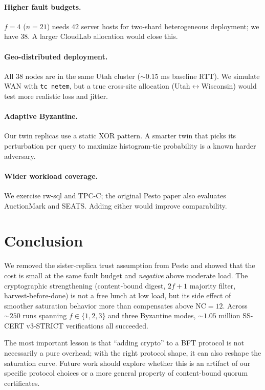 \documentclass[letterpaper,twocolumn,10pt]{article}
\begin{document}
\paragraph{Higher fault budgets.} $f=4$ ($n=21$) needs $42$ server
hosts for two-shard heterogeneous deployment; we have $38$. A larger
CloudLab allocation would close this.

\paragraph{Geo-distributed deployment.} All $38$ nodes are in the same
Utah cluster ($\sim 0.15$ ms baseline RTT). We simulate WAN with
\texttt{tc netem}, but a true cross-site allocation
(Utah$\leftrightarrow$Wisconsin) would test more realistic loss and
jitter.

\paragraph{Adaptive Byzantine.} Our twin replicas use a static XOR
pattern. A smarter twin that picks its perturbation per query to
maximize histogram-tie probability is a known harder adversary.

\paragraph{Wider workload coverage.} We exercise rw-sql and TPC-C; the
original Pesto paper also evaluates AuctionMark and SEATS. Adding
either would improve comparability.


\section{Conclusion}

We removed the sister-replica trust assumption from Pesto and showed
that the cost is small at the same fault budget and \emph{negative}
above moderate load. The cryptographic strengthening
(content-bound digest, $2f{+}1$ majority filter, harvest-before-done)
is not a free lunch at low load, but its side effect of smoother
saturation behavior more than compensates above $\mathrm{NC}=12$.
Across $\sim 250$ runs spanning $f \in \{1, 2, 3\}$ and three
Byzantine modes, $\sim 1.05$ million SS-CERT v3-STRICT
verifications all succeeded.

The most important lesson is that ``adding crypto'' to a BFT
protocol is not necessarily a pure overhead; with the right protocol
shape, it can also reshape the saturation curve. Future work should
explore whether this is an artifact of our specific protocol choices
or a more general property of content-bound quorum certificates.
\end{document}
